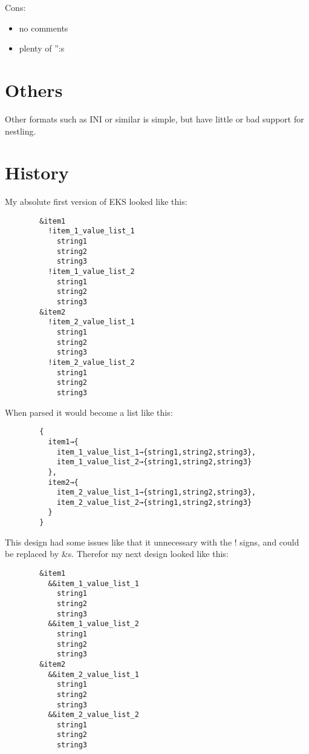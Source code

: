 \documentclass{book}
\begin{document}
	Cons:
	
	\begin{itemize}
		\item no comments
		\item plenty of '':s
	\end{itemize}
	
	\section{Others}
	
	Other formats such as INI or similar is simple, but have little or bad support for nestling.
	
	\section{History}
	
	My absolute first version of EKS looked like this:
	
	\begin{verbatim}
		&item1
		  !item_1_value_list_1
		    string1
		    string2
		    string3
		  !item_1_value_list_2
		    string1
		    string2
		    string3
		&item2
		  !item_2_value_list_1
		    string1
		    string2
		    string3
		  !item_2_value_list_2
		    string1
		    string2
		    string3
	\end{verbatim}
	
	When parsed it would become a list like this:\\
	
	\begin{verbatim}
		{
		  item1→{
		    item_1_value_list_1→{string1,string2,string3},
		    item_1_value_list_2→{string1,string2,string3}
		  },
		  item2→{
		    item_2_value_list_1→{string1,string2,string3},
		    item_2_value_list_2→{string1,string2,string3}
		  }
		}
	\end{verbatim}
	
	This design had some issues like that it unnecessary with the ! signs, and could be replaced by \&s. Therefor my next design looked like this:
	
	\begin{verbatim}
		&item1
		  &&item_1_value_list_1
		    string1
		    string2
		    string3
		  &&item_1_value_list_2
		    string1
		    string2
		    string3
		&item2
		  &&item_2_value_list_1
		    string1
		    string2
		    string3
		  &&item_2_value_list_2
		    string1
		    string2
		    string3
	\end{verbatim}
	
\end{document}
